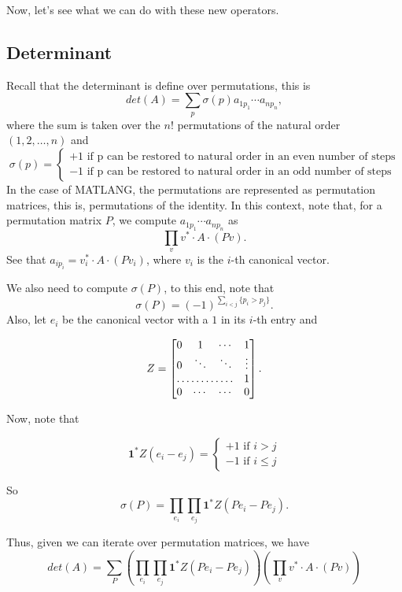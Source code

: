 Now, let's see what we can do with these new operators.

\subsection*{Determinant}

Recall that the determinant is define over permutations, this is $$det(A)=\sum_{p}\sigma(p)a_{1p_1}\cdots a_{np_n},$$ where the sum is taken over the $n!$ permutations of the natural order $(1, 2,\ldots, n)$ and 
       \[
  			\sigma(p)=\begin{cases}
               +1 \text{ if p can be restored to natural order in an even number of steps} \\
               -1 \text{ if p can be restored to natural order in an odd number of steps}
            \end{cases}
		\]
In the case of MATLANG, the permutations are represented as permutation matrices, this is, permutations of the identity. In this context, note that, for a permutation matrix $P$, we compute $a_{1p_1}\cdots a_{np_n}$ as $$\prod_v v^*\cdot A\cdot (Pv).$$ See that $a_{ip_i}=v_i^*\cdot A\cdot (Pv_i)$, where $v_i$ is the $i$-th canonical vector. 


We also need to compute $\sigma(P)$, to this end, note that $$\sigma(P)=(-1)^{\sum_{i<j}\lbrace p_i>p_j\rbrace}.$$ Also, let $e_i$ be the canonical vector with a $1$ in its $i$-th entry and 

\[
Z = \begin{bmatrix}
    0 & 1 & \cdots &  1 \\
    0 & \ddots & \ddots & \vdots \\
    \hdotsfor{3} & 1 \\
    0 & \cdots & \cdots & 0 
\end{bmatrix}.
\]

Now, note that 

 		\[
  			\mathbf{1}^*Z(e_i-e_j)=\begin{cases}
               +1 \text{ if } i > j \\
               -1 \text{ if } i \leq j
            \end{cases}
		\]

So $$\sigma(P)=\prod_{e_i}\prod_{e_j}\mathbf{1}^*Z(Pe_i-Pe_j).$$

Thus, given we can iterate over permutation matrices, we have $$det(A)=\sum_{P}\left(\prod_{e_i}\prod_{e_j}\mathbf{1}^*Z(Pe_i-Pe_j)\right)\left(\prod_v v^*\cdot A\cdot (Pv)\right)$$

\label{sec:iteration}